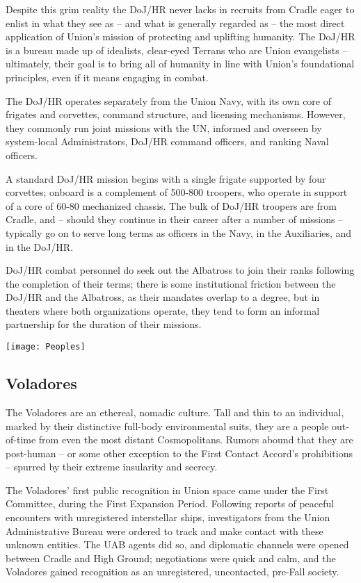 Despite this grim reality the DoJ/HR never lacks in recruits from Cradle eager to enlist in what
they see as -- and what is generally regarded as -- the most direct application of Union’s mission
of protecting and uplifting humanity. The DoJ/HR is a bureau made up of idealists, clear-eyed
Terrans who are Union evangelists -- ultimately, their goal is to bring all of humanity in line with
Union’s foundational principles, even if it means engaging in combat.

The DoJ/HR operates separately from the Union Navy, with its own core of frigates and corvettes,
command structure, and licensing mechanisms. However, they commonly run joint missions with
the UN, informed and overseen by system-local Administrators, DoJ/HR command officers, and
ranking Naval officers.

A standard DoJ/HR mission begins with a single frigate supported by four corvettes; onboard is a
complement of 500-800 troopers, who operate in support of a core of 60-80 mechanized chassis.
The bulk of DoJ/HR troopers are from Cradle, and -- should they continue in their career after a
number of missions -- typically go on to serve long terms as officers in the Navy, in the Auxiliaries,
and in the DoJ/HR.

DoJ/HR combat personnel do seek out the Albatross to join their ranks following the completion of
their terms; there is some institutional friction between the DoJ/HR and the Albatross, as their
mandates overlap to a degree, but in theaters where both organizations operate, they tend to form
an informal partnership for the duration of their missions.


\begin{center}
  \texttt{[image: Peoples]}
\end{center}
\subsection{Voladores}


The Voladores are an ethereal, nomadic culture. Tall and thin to an individual, marked by their
distinctive full-body environmental suits, they are a people out-of-time from even the most
distant Cosmopolitans. Rumors abound that they are post-human -- or some other exception to
the First Contact Accord’s prohibitions -- spurred by their extreme insularity and secrecy.


The Voladores’ first public recognition in Union space came under the First Committee, during
the First Expansion Period. Following reports of peaceful encounters with unregistered
interstellar ships, investigators from the Union Administrative Bureau were ordered to track and
make contact with these unknown entities. The UAB agents did so, and diplomatic channels
were opened between Cradle and High Ground; negotiations were quick and calm, and the
Voladores gained recognition as an unregistered, uncontacted, pre-Fall society.


